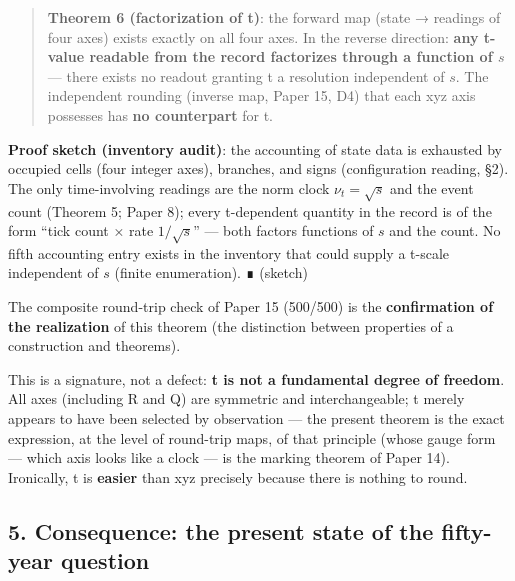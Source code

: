 \documentclass[
]{ltjsarticle}
\begin{document}
\begin{quote}
\textbf{Theorem 6 (factorization of t)}: the forward map (state →
readings of four axes) exists exactly on all four axes. In the reverse
direction: \textbf{any t-value readable from the record factorizes
through a function of \(s\)} --- there exists no readout granting t a
resolution independent of \(s\). The independent rounding (inverse map,
Paper 15, D4) that each xyz axis possesses has \textbf{no counterpart}
for t.
\end{quote}

\textbf{Proof sketch (inventory audit)}: the accounting of state data is
exhausted by occupied cells (four integer axes), branches, and signs
(configuration reading, §2). The only time-involving readings are the
norm clock \(\nu_t=\sqrt{s}\) and the event count (Theorem 5; Paper 8);
every t-dependent quantity in the record is of the form ``tick count ×
rate \(1/\sqrt{s}\)'' --- both factors functions of \(s\) and the count.
No fifth accounting entry exists in the inventory that could supply a
t-scale independent of \(s\) (finite enumeration). ∎ (sketch)

The composite round-trip check of Paper 15 (500/500) is the
\textbf{confirmation of the realization} of this theorem (the
distinction between properties of a construction and theorems).

This is a signature, not a defect: \textbf{t is not a fundamental degree
of freedom}. All axes (including R and Q) are symmetric and
interchangeable; t merely appears to have been selected by observation
--- the present theorem is the exact expression, at the level of
round-trip maps, of that principle (whose gauge form --- which axis
looks like a clock --- is the marking theorem of Paper 14). Ironically,
t is \textbf{easier} than xyz precisely because there is nothing to
round.

\subsection{5. Consequence: the present state of the fifty-year
question}\label{consequence-the-present-state-of-the-fifty-year-question}
\end{document}

